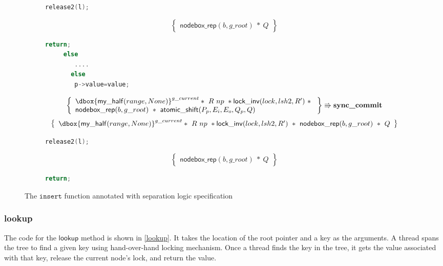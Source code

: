 \documentclass[acmsmall,screen]{acmart}\settopmatter{printfolios=true}
\newcommand\dboxed[1]{\dbox{\ensuremath{#1}}}
\newcommand{\ghost}[2]{\ensuremath{\dboxed{#1}^{#2}}}
\begin{document}
\begin{figure}[htp]
\begin{subfigure}[t]{1\textwidth}
 \vspace*{-10pt}
        \begin{lstlisting}[language = C,numbers = none]
      release2(l);
         \end{lstlisting}
       $$\left\{\begin{array}{l} \mathsf{nodebox\_rep}(b,g\_root)\ *\ Q\end{array}\right\}$$
        \vspace*{-10pt}
         \begin{lstlisting}[language = C,numbers = none]
      return;
     else 
        ....
       else 
      	p->value=value;
      	\end{lstlisting} 
$$\left\{\begin{array}{l} \ghost{\mathsf{my\_half}(range,None)}{g\_current}*\ R\ np\ *
\mathsf{lock\_inv}(lock,lsh2,R')\ *\ \\\mathsf{nodebox\_rep}(b,g\_root)\ *\ \mathsf{atomic\_shift}(P_p,E_i,E_o,Q_p,Q)\end{array}\right\} \Rrightarrow{\textbf{sync\_commit}}$$
$$\left\{\begin{array}{l} \ghost{\mathsf{my\_half}(range,None)}{g\_current}*\ R\ np\ *\mathsf{lock\_inv}(lock,lsh2,R')\ *\ \mathsf{nodebox\_rep}(b,g\_root)\ *\ Q\end{array}\right\}$$
         \vspace*{-10pt}
      	\begin{lstlisting}[language = C, numbers = none]
        release2(l);
        \end{lstlisting}
        $$\left\{\begin{array}{l}  \mathsf{nodebox\_rep}(b,g\_root)\ *\ Q\end{array}\right\}$$
         \vspace*{-10pt}
        \begin{lstlisting}[language = C, numbers = none] 
      	return;
\end{lstlisting}
\end{subfigure}
\caption{The $\texttt{insert}$ function annotated with separation logic specification}
\label{insertproof}
\end{figure} 


\subsubsection{lookup}

The code for the $\mathsf{lookup}$ method is shown in \ref{lookup}. It takes the location of the root pointer and a key as the arguments. A thread spans the tree to find a given key using hand-over-hand locking mechanism. Once a thread finds the key in the tree, it gets the value associated with that key, release the current node's lock, and return the value. 
\end{document}
